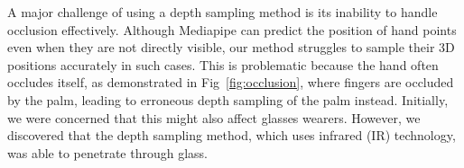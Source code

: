 \begin{invisBox}
    \hfill
\end{invisBox}

A major challenge of using a depth sampling method is its inability to handle occlusion effectively. Although Mediapipe can predict the position of hand points even when they are not directly visible, our method struggles to sample their 3D positions accurately in such cases. This is problematic because the hand often occludes itself, as demonstrated in Fig~\ref{fig:occlusion}, where fingers are occluded by the palm, leading to erroneous depth sampling of the palm instead. Initially, we were concerned that this might also affect glasses wearers. However, we discovered that the depth sampling method, which uses infrared (IR) technology, was able to penetrate through glass.

